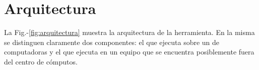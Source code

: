 
\section{Arquitectura}

\newcommand{\fig}{Fig.-}

La \fig\ref{fig:arquitectura} muestra la arquitectura de la herramienta. En
la misma se distinguen claramente dos componentes: el \bend que ejecuta sobre
un \cluster de computadoras y el \fend que ejecuta en un equipo que se
encuentra posiblemente fuera del centro de cómputos.

